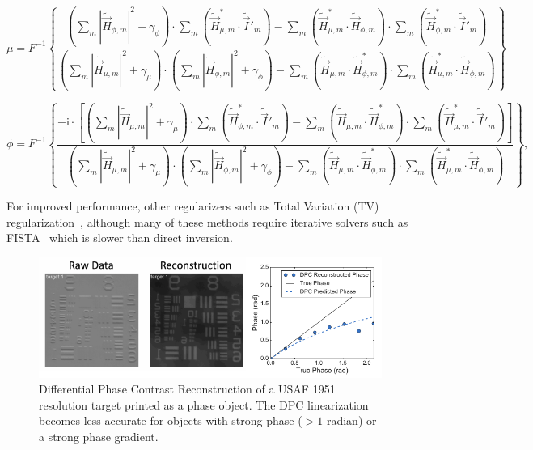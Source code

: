 \begin{equation} \label{eq:Ha_inverse}
\mu = F^{-1}\left\{\frac{\left(\sum\limits_{m}|\tilde{\vec{H}}_{\phi,m}|^2+\gamma_{\phi}\right)\cdot\sum\limits_{m}\left(\tilde{\vec{H}}^*_{\mu,m}\cdot\tilde{\vec{I}}'_{m}\right)-\sum\limits_{m} \left ( \tilde{\vec{H}}^*_{\mu,m}\cdot\tilde{\vec{H}}_{\phi,m} \right ) \cdot\sum\limits_{m}\left(\tilde{\vec{H}}^*_{\phi,m}\cdot\tilde{\vec{I}}'_{m}\right)}{\left(\sum\limits_{m}|\tilde{\vec{H}}_{\mu,m}|^2+\gamma_{\mu}\right)\cdot\left(\sum\limits_{m}|\tilde{\vec{H}}_{\phi,m}|^2+\gamma_{\phi}\right) - \sum\limits_{m}\left(\tilde{\vec{H}}_{\mu,m}\cdot\tilde{\vec{H}}^*_{\phi,m}\right)\cdot\sum\limits_{m}\left(\tilde{\vec{H}}^*_{\mu,m}\cdot\tilde{\vec{H}}_{\phi,m}\right)} \right\}
\end{equation}

\begin{equation} \label{eq:Hp_inverse}
\phi = F^{-1}\left\{\frac{-\mathrm{i}\cdot\left[\left(\sum\limits_{m}|\tilde{\vec{H}}_{\mu,m}|^2+\gamma_{\mu}\right)\cdot\sum\limits_{m}\left(\tilde{\vec{H}}^*_{\phi,m}\cdot\tilde{\vec{I}}'_{m}\right)-\sum\limits_{m}\left(\tilde{\vec{H}}_{\mu,m}\cdot\tilde{\vec{H}}^*_{\phi,m}\right)\cdot\sum\limits_{m}\left(\tilde{\vec{H}}^*_{\mu,m}\cdot\tilde{\vec{I}}'_{m}\right)\right]}{\left(\sum\limits_{m}|\tilde{\vec{H}}_{\mu,m}|^2+\gamma_{\mu}\right)\cdot\left(\sum\limits_{m}|\tilde{\vec{H}}_{\phi,m}|^2+\gamma_{\phi}\right)-\sum\limits_{m}\left(\tilde{\vec{H}}_{\mu,m}\cdot\tilde{\vec{H}}^*_{\phi,m}\right)\cdot\sum\limits_{m} \left( \tilde{\vec{H}}^*_{\mu,m}\cdot\tilde{\vec{H}}_{\phi,m} \right )} \right\},
\end{equation}

\noindent For improved performance, other regularizers such as Total Variation (TV) regularization~\cite{osher2005iterative}, although many of these methods require iterative solvers such as FISTA~\cite{beck2009fast} which is slower than direct inversion.

\begin{figure}[tbh]
\centering
\includegraphics[width=1.0\textwidth]{figures/fig_phase_dpc_validation_2.pdf}
\caption{\label{fig:dpc_validation}
Differential Phase Contrast Reconstruction of a USAF 1951 resolution target printed as a phase object. The DPC linearization becomes less accurate for objects with strong phase ($> 1$ radian) or a strong phase gradient.}
\end{figure}

